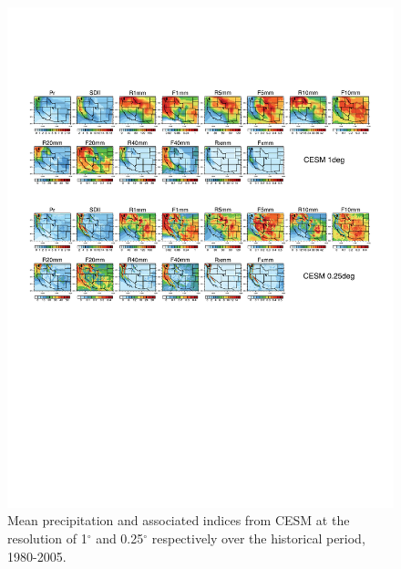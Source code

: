 \begin{figure}
\begin{center}
\includegraphics[width=6in]{supplement/wd_index_hist_se1deg_fvQuarterdeg_cesm.pdf}
\caption{Mean precipitation and associated indices from CESM at the resolution of 1$^\circ$ and 0.25$^\circ$ respectively over the historical period, 1980-2005.}
\end{center}
\label{fig:S3}
\end{figure}

